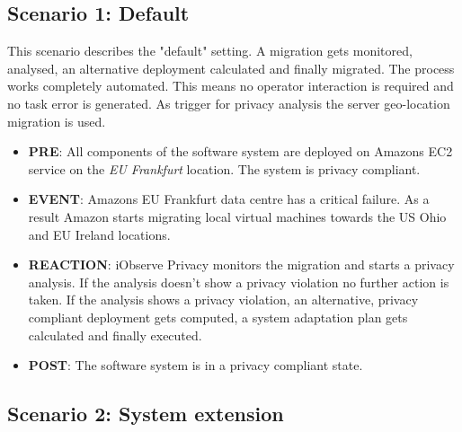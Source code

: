 \subsection{Scenario 1: Default}
\label{eval:scenario:1}
This scenario describes the "default" setting. A migration gets monitored, analysed, an alternative deployment calculated and finally migrated. The process works completely automated. This means no operator interaction is required and no task error is generated. As trigger for privacy analysis the server geo-location migration is used.
\begin{itemize}
	\setlength\itemsep{0em}
	\item \textbf{PRE}: All components of the software system are deployed on Amazons EC2 service on the \textit{EU Frankfurt} location. The system is privacy compliant.
	\item \textbf{EVENT}: Amazons EU Frankfurt data centre has a critical failure. As a result Amazon starts migrating local virtual machines towards the US Ohio and EU Ireland locations.
	\item \textbf{REACTION}: iObserve Privacy monitors the migration and starts a privacy analysis. If the analysis doesn't show a privacy violation no further action is taken. If the analysis shows a privacy violation, an alternative, privacy compliant deployment gets computed, a system adaptation plan gets calculated and finally executed.
	\item \textbf{POST}: The software system is in a privacy compliant state.
\end{itemize}


\subsection{Scenario 2: System extension}
\label{eval:scenario:2}

